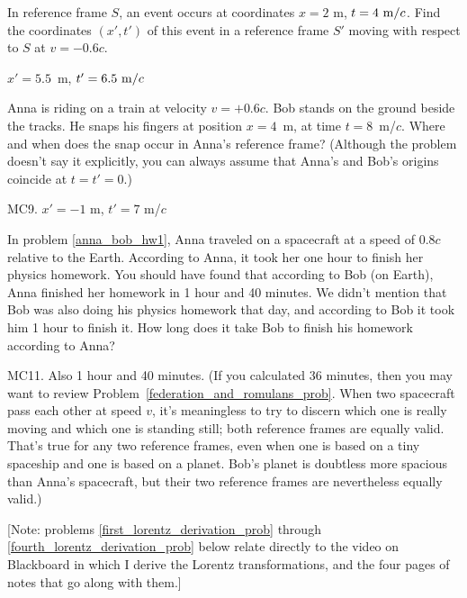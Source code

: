 \begin{Exercise}
In reference frame $S$, an event occurs at coordinates $x=2$ m, $t=4~{\rm m}/c$.  Find the coordinates $(x',t')$ of this event in a reference frame $S'$ moving with respect to $S$ at $v=-0.6c$.
\end{Exercise}
\begin{Answer}
$x'=5.5$~m, $t'=6.5~{\rm m}/c$
\end{Answer}


\begin{Exercise}
Anna is riding on a train at velocity $v=+0.6c$.  Bob stands on the ground beside the tracks.  He snaps his fingers at position $x=4$~m, at time $t=8$~m/$c$.  Where and when does the snap occur in Anna's reference frame?  (Although the problem doesn't say it explicitly, you can always assume that Anna's and Bob's origins coincide at $t=t'=0$.)
\end{Exercise}
\begin{Answer}
MC9. $x'=-1$ m, $ t'=7$ m/$c$
\end{Answer}


\begin{Exercise}
In problem \ref{anna_bob_hw1}, Anna traveled on a spacecraft at a speed of $0.8c$ relative to the Earth.  According to Anna, it took her one hour to finish her physics homework.  You should have found that according to Bob (on Earth), Anna finished her homework in 1 hour and 40 minutes.  We didn't mention that Bob was also doing his physics homework that day, and according to Bob it took him 1 hour to finish it.  How long does it take Bob to finish his homework according to Anna?
\end{Exercise}
\begin{Answer}
MC11. Also 1 hour and 40 minutes.  (If you calculated 36 minutes, then you may want to review 
Problem~\ref{federation_and_romulans_prob}.  When two spacecraft pass each other at speed $v$, it's meaningless to try to discern which one is really moving and which one is standing still; both reference frames are equally valid.  That's true for any two reference frames, even when one is based on a tiny spaceship and one is based on a planet.  Bob's planet is doubtless more spacious than Anna's spacecraft, but their two reference frames are nevertheless equally valid.)
\end{Answer}

[Note: problems \ref{first_lorentz_derivation_prob} through \ref{fourth_lorentz_derivation_prob} below relate directly to the video on Blackboard in which I derive the Lorentz transformations, and the four pages of notes that go along with them.]  

